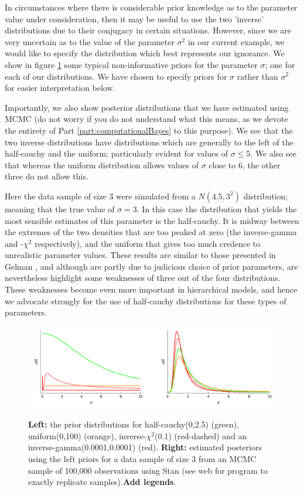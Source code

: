 \documentclass[11pt,fullpage]{book}
\begin{document}
In circumstances where there is considerable prior knowledge as to the parameter value under consideration, then it may be useful to use the two 'inverse' distributions due to their conjugacy in certain situations.  However, since we are very uncertain as to the value of the parameter $\sigma^2$ in our current example, we would like to specify the distribution which best represents our ignorance. We show in figure \ref{fig:Distributions_halfCauchyPrior} some typical non-informative priors for the parameter $\sigma$; one for each of our distributions. We have chosen to specify priors for $\sigma$ rather than $\sigma^2$ for easier interpretation below.

Importantly, we also show posterior distributions that we have estimated using MCMC (do not worry if you do not understand what this means, as we devote the entirety of Part \ref{part:computationalBayes} to this purpose). We see that the two inverse distributions have distributions which are generally to the left of the half-cauchy and the uniform; particularly evident for values of $\sigma\leq 5$. We also see that whereas the uniform distribution allows values of $\sigma$ close to 6, the other three do not allow this. 

Here the data sample of size 3 were simulated from a $N(4.5,3^2)$ distribution; meaning that the true value of $\sigma=3$. In this case the distribution that yields the most sensible estimates of this parameter is the half-cauchy. It is midway between the extremes of the two densities that are too peaked at zero (the inverse-gamma and -$\chi^2$ respectively), and the uniform that gives too much credence to unrealistic parameter values. These results are similar to those presented in Gelman \cite{gelman2006prior}, and although are partly due to judicious choice of prior parameters, are nevertheless highlight some weaknesses of three out of the four distributions. These weaknesses become even more important in hierarchical models, and hence we advocate strongly for the use of half-cauchy distributions for these types of parameters.

\begin{figure}
\centering
\scalebox{0.5} 
{\includegraphics{Distributions_halfCauchyPrior.pdf}}
\caption{\textbf{Left:} the prior distributions for half-cauchy(0,2.5) (green), uniform(0,100) (orange), inverse-$\chi^2$(0.1) (red-dashed) and an inverse-gamma(0.0001,0.0001) (red). \textbf{Right:} estimated posteriors using the left priors for a data sample of size 3 from an MCMC sample of 100,000 observations using Stan (see web for program to exactly replicate samples).\textbf{Add legends}.}\label{fig:Distributions_halfCauchyPrior}
\end{figure}
\end{document}
